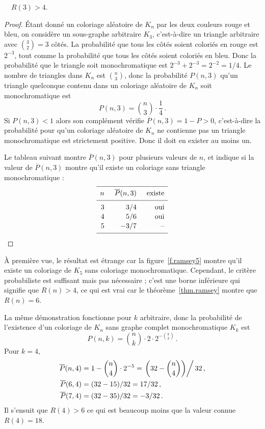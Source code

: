 \begin{theorem}[Erd\H{o}s]
$\quad R(3) > 4$.
\end{theorem}
\begin{proof}
Étant donné un coloriage aléatoire de $K_n$ par les deux couleurs rouge et bleu, on considère un sous-graphe arbitraire $K_3$, c'est-à-dire un triangle arbitraire avec $\binom{3}{2}=3$ côtés. La probabilité que tous les côtés soient coloriés en rouge est $2^{-3}$, tout comme la probabilité que tous les côtés soient coloriés en bleu. Donc la probabilité que le triangle soit monochromatique est $2^{-3}+2^{-3}=2^{-2}=1/4$. Le nombre de triangles dans $K_n$ est $\binom{n}{3}$, donc  la probabilité  $P(n,3)$ qu'un triangle quelconque contenu dans un coloriage aléatoire de $K_n$ soit monochromatique est 
\[
P(n,3)=\binom{n}{3}\cdot \frac{1}{4}\,.
\]
Si $P(n,3)<1$ alors son complément vérifie $\overline{P}(n,3)=1-P>0$, c'est-à-dire la probabilité pour qu'un coloriage aléatoire de $K_n$ ne contienne pas un triangle monochromatique est strictement positive. Donc il doit en exister au moins un.

Le tableau suivant montre $\overline{P}(n,3)$ pour plusieurs valeurs de $n$, et indique si la valeur de $\overline{P}(n,3)$ montre qu'il existe un coloriage sans triangle monochromatique :
\[
\renewcommand*{\arraystretch}{1.1}
\begin{array}{r@{\hspace{5mm}}r@{\hspace{5mm}}r}
\hline
\noalign{\smallskip}
n & \overline{P}(n,3) & \text{existe}\\
\noalign{\smallskip}\hline\noalign{\smallskip}
3 & 3/4 & \text{oui} \\
4 & 5/6 & \text{oui}\\
5 & -3/7 & \textrm{--}\\
\noalign{\smallskip}
 \hline
 \end{array}\qedhere
\]
\end{proof}
\`A première vue, le résultat est étrange car la figure~\ref{f.ramsey5} montre qu'il existe un coloriage de $K_5$ sans coloriage monochromatique. Cependant, le critère probabiliste est suffisant mais pas nécessaire ; c'est une borne inférieure qui signifie que $R(n)>4$, ce qui est vrai car le théorème~\ref{thm.ramsey} montre que $R(n)=6$.

La même démonstration fonctionne pour $k$ arbitraire, donc la probabilité de l'existence d'un coloriage de $K_n$ sans graphe complet monochromatique $K_k$ est 
\[
P(n,k)=\binom{n}{k}\cdot 2\cdot 2^{-\binom{k}{2}}\,.
\]
Pour $k=4$,
\begin{align*}
\overline{P}(n,4)&=1-\binom{n}{4}\cdot 2^{-5}=\left.\left(32-\binom{n}{4}\right)\right/32\,,\\
\overline{P}(6,4)&=(32-15)/32=17/32\,,\\
\overline{P}(7,4)&=(32-35)/32=-3/32\,.
\end{align*}
Il s'ensuit que $R(4)>6$ ce qui est beaucoup moins que la valeur connue $R(4)=18$.


